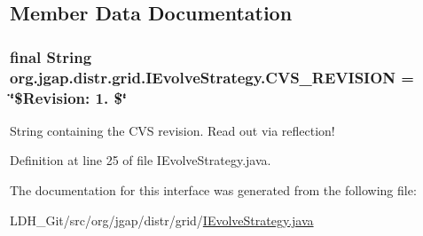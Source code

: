 \subsection{Member Data Documentation}
\hypertarget{interfaceorg_1_1jgap_1_1distr_1_1grid_1_1_i_evolve_strategy_a9ced2cbebb6f50e6c8c8d2ddc150b9dc}{
\subsubsection[{C\-V\-S\-\_\-\-R\-E\-V\-I\-S\-I\-O\-N}]{\setlength{\rightskip}{0pt plus 5cm}final String org.\-jgap.\-distr.\-grid.\-I\-Evolve\-Strategy.\-C\-V\-S\-\_\-\-R\-E\-V\-I\-S\-I\-O\-N = \char`\"{}\$Revision\-: 1. \$\char`\"{}\hspace{0.3cm}{\ttfamily [static]}}}\label{interfaceorg_1_1jgap_1_1distr_1_1grid_1_1_i_evolve_strategy_a9ced2cbebb6f50e6c8c8d2ddc150b9dc}
String containing the C\-V\-S revision. Read out via reflection! 

Definition at line 25 of file I\-Evolve\-Strategy.\-java.



The documentation for this interface was generated from the following file\-:\begin{DoxyCompactItemize}
\item 
L\-D\-H\-\_\-\-Git/src/org/jgap/distr/grid/\hyperlink{_i_evolve_strategy_8java}{I\-Evolve\-Strategy.\-java}\end{DoxyCompactItemize}
